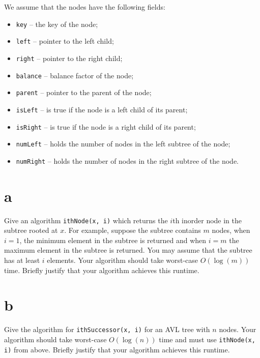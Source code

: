 \documentclass[12pt]{article}
\begin{document}
	We assume that the nodes have the following fields:
	\begin{itemize}
		\item {\tt key} -- the key of the node;
		\item {\tt left} -- pointer to the left child;
		\item {\tt right} -- pointer to the right child;
		\item {\tt balance} -- balance factor of the node;
		\item {\tt parent} -- pointer to the parent of the node;
		\item {\tt isLeft} -- is true if the node is a left child of its parent;
		\item {\tt isRight} -- is true if the node is a right child of its parent;
		\item {\tt numLeft} -- holds the number of nodes in the left subtree of the node;
		\item {\tt numRight} -- holds the number of nodes in the right subtree of the node.
	\end{itemize}
	
	\medskip
	
	\begin{enumerate}
		
		\part{a} Give an algorithm {\tt ithNode(x, i)} which returns the $i$th inorder node in the subtree rooted at $x$.
		For example, suppose the subtree contains $m$ nodes, when $i=1$, the minimum element in the subtree is returned and when $i=m$ the maximum element in the subtree is returned.
		You may assume that the subtree has at least $i$ elements.
		Your algorithm should take worst-case $O(\log(m))$ time.
		Briefly justify that your algorithm achieves this runtime.
		
		\part{b} Give the algorithm for {\tt ithSuccessor(x, i)} for an AVL tree with $n$ nodes.  
		Your algorithm should take worst-case $O(\log(n))$ time and must use {\tt ithNode(x, i)} from above.
		Briefly justify that your algorithm achieves this runtime.
	\end{enumerate}
	
	
	
	
\end{document}
